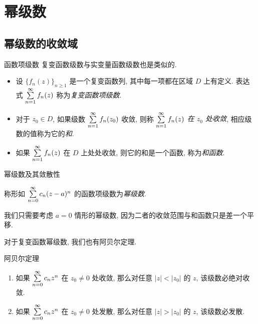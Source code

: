 \section{幂级数}


\subsection{幂级数的收敛域}
\begin{frame}{函数项级数}
\onslide<+->
复变函数级数与实变量函数级数也是类似的.
\onslide<+->
\begin{definition}
\begin{itemize}
\item 设 $\{f_n(z)\}_{n\ge 1}$ 是一个复变函数列, 其中每一项都在区域 $D$ 上有定义.
\onslide<+->
表达式 $\sum\limits_{n=1}^\infty f_n(z)$ 称为\emph{复变函数项级数}.
\item 对于 $z_0\in D$, 如果级数 $\sum\limits_{n=1}^\infty f_n(z_0
)$ 收敛, 则称 \emph{$\sum\limits_{n=1}^\infty f_n(z)$ 在 $z_0$ 处收敛}, 相应级数的值称为它的\emph{和}.
\item 如果 $\sum\limits_{n=1}^\infty f_n(z)$ 在 $D$ 上处处收敛, 则它的和是一个函数, 称为\emph{和函数}.
\end{itemize}
\end{definition}
\end{frame}


\begin{frame}{幂级数及其敛散性}
\onslide<+->
\begin{definition}
称形如 $\sum\limits_{n=0}^\infty c_n(z-a)^n$ 的函数项级数为\emph{幂级数}.
\end{definition}
\onslide<+->
我们只需要考虑 $a=0$ 情形的幂级数, 因为二者的收敛范围与和函数只是差一个平移.

\onslide<+->
对于复变函数幂级数, 我们也有阿贝尔定理.
\begin{block}{阿贝尔定理}
\begin{enumerate}
\item 如果 $\sum\limits_{n=0}^\infty c_nz^n$ 在 $z_0\neq 0$ 处收敛, 那么对任意 $|z|<|z_0|$ 的 $z$, 该级数必绝对收敛.
\item 如果 $\sum\limits_{n=0}^\infty c_nz^n$ 在 $z_0\neq 0$ 处发散, 那么对任意 $|z|>|z_0|$ 的 $z$, 该级数必发散.
\end{enumerate}
\end{block}
\end{frame}


